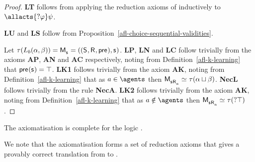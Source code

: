 \begin{proof}
    {\bf LT} follows from applying the reduction axioms of \axiomAmlK{} inductively to $\allacts{\test{\phi}} \psi$.

    {\bf LU} and {\bf LS} follow from Proposition~\ref{afl-choice-sequential-validities}.

    Let $\tau(\learns_\agentB (\alpha, \beta)) = \aPModel{\aStateS} = \aPModelTuple{\aStateS}$.
    {\bf LP}, {\bf LN} and {\bf LC} follow trivially from the \axiomAmlK{} axioms {\bf AP}, {\bf AN} and {\bf AC} respectively, noting from Definition~\ref{afl-k-learning} that $\aPrecondition(\aStateS) = \top$.
    {\bf LK1} follows trivially from the \axiomAmlK{} axiom {\bf AK}, noting from Definition~\ref{afl-k-learning} that as $\agentA \in \agents$ then $\aPModel{\aStateS \aAccessibility{\agentA}} \bisimilar \tau(\alpha \choice \beta)$.
    {\bf NecL} follows trivially from the \axiomAmlK{} rule {\bf NecA}.
    {\bf LK2} follows trivially from the \axiomAmlK{} axiom {\bf AK}, noting from Definition~\ref{afl-k-learning} that as $\agentA \notin \agents$ then $\aPModel{\aStateS \aAccessibility{\agentA}} \bisimilar \tau(\test{\top})$.
\end{proof}

\begin{proposition}\label{afl-k-axioms-completeness}
    The axiomatisation \axiomAflK{} is complete for the logic \logicAmlK{}.
\end{proposition}

We note that the axiomatisation \axiomAflK{} forms a set of reduction axioms that gives a provably correct translation from \langAfl{} to \lang{}.

